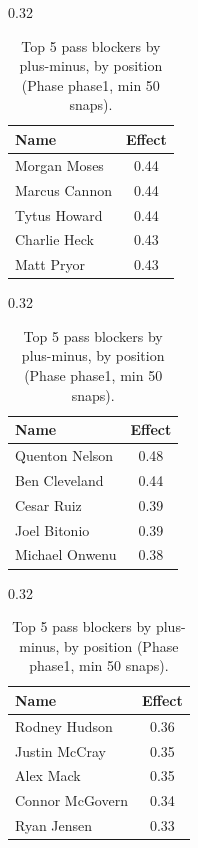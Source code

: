 \begin{table}[h!]
\centering
\begin{subtable}{0.32\textwidth}
\centering
\footnotesize
\begin{tabular}{lc}
\toprule
Name & Effect \\
\midrule
Morgan Moses & 0.44 \\
Marcus Cannon & 0.44 \\
Tytus Howard & 0.44 \\
Charlie Heck & 0.43 \\
Matt Pryor & 0.43 \\
\bottomrule
\end{tabular}
\caption{T}
\end{subtable}
\hfill
\begin{subtable}{0.32\textwidth}
\centering
\footnotesize
\begin{tabular}{lc}
\toprule
Name & Effect \\
\midrule
Quenton Nelson & 0.48 \\
Ben Cleveland & 0.44 \\
Cesar Ruiz & 0.39 \\
Joel Bitonio & 0.39 \\
Michael Onwenu & 0.38 \\
\bottomrule
\end{tabular}
\caption{G}
\end{subtable}
\hfill
\begin{subtable}{0.32\textwidth}
\centering
\footnotesize
\begin{tabular}{lc}
\toprule
Name & Effect \\
\midrule
Rodney Hudson & 0.36 \\
Justin McCray & 0.35 \\
Alex Mack & 0.35 \\
Connor McGovern & 0.34 \\
Ryan Jensen & 0.33 \\
\bottomrule
\end{tabular}
\caption{C}
\end{subtable}
\caption{Top 5 pass blockers by plus-minus, by position (Phase phase1, min 50 snaps).}
\label{tab:blocker_pm_phase1_top}
\end{table}

